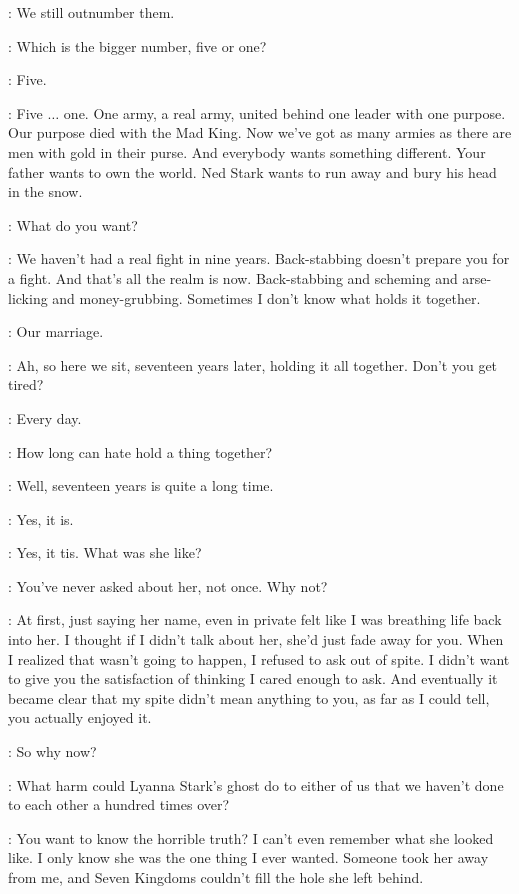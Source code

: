 \CERSEI: We still outnumber them. 

\ROBERT: Which is the bigger number, five or one? 

\CERSEI: Five. 

\ROBERT:  Five $\ldots$ one. One army, a real army, united behind one leader with one purpose. Our purpose died with the Mad King. Now we've got as many armies as there are men with gold in their purse. And everybody wants something different. Your father wants to own the world. Ned Stark wants to run away and bury his head in the snow. 

\CERSEI: What do you want? 

\ROBERT: We haven't had a real fight in nine years. Back-stabbing doesn't prepare you for a fight. And that's all the realm is now. Back-stabbing and scheming and arse-licking and money-grubbing. Sometimes I don't know what holds it together. 

\CERSEI: Our marriage. 


\ROBERT: Ah, so here we sit, seventeen years later, holding it all together. Don't you get tired? 

\CERSEI: Every day. 

\ROBERT: How long can hate hold a thing together? 

\CERSEI: Well, seventeen years is quite a long time. 

\ROBERT: Yes, it is. 

\CERSEI: Yes, it tis. What was she like? 

\ROBERT: You've never asked about her, not once. Why not? 

\CERSEI: At first, just saying her name, even in private felt like I was breathing life back into her. I thought if I didn't talk about her, she'd just fade away for you. When I realized that wasn't going to happen, I refused to ask out of spite. I didn't want to give you the satisfaction of thinking I cared enough to ask. And eventually it became clear that my spite didn't mean anything to you, as far as I could tell, you actually enjoyed it. 

\ROBERT: So why now? 

\CERSEI: What harm could Lyanna Stark's ghost do to either of us that we haven't done to each other a hundred times over? 

\ROBERT: You want to know the horrible truth? I can't even remember what she looked like. I only know she was the one thing I ever wanted.  Someone took her away from me, and Seven Kingdoms couldn't fill the hole she left behind. 

